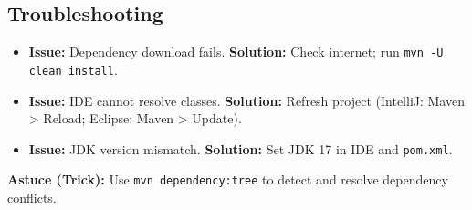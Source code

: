 \documentclass[12pt,a4paper]{report}
\begin{document}
\subsection{Troubleshooting}
\begin{itemize}
    \item \textbf{Issue:} Dependency download fails.
      \textbf{Solution:} Check internet; run \texttt{mvn -U clean install}.
    \item \textbf{Issue:} IDE cannot resolve classes.
      \textbf{Solution:} Refresh project (IntelliJ: Maven > Reload; Eclipse: Maven > Update).
    \item \textbf{Issue:} JDK version mismatch.
      \textbf{Solution:} Set JDK 17 in IDE and \texttt{pom.xml}.
\end{itemize}

\begin{framed}
\textbf{Astuce (Trick):} Use \texttt{mvn dependency:tree} to detect and resolve dependency conflicts.
\end{framed}
\end{document}
